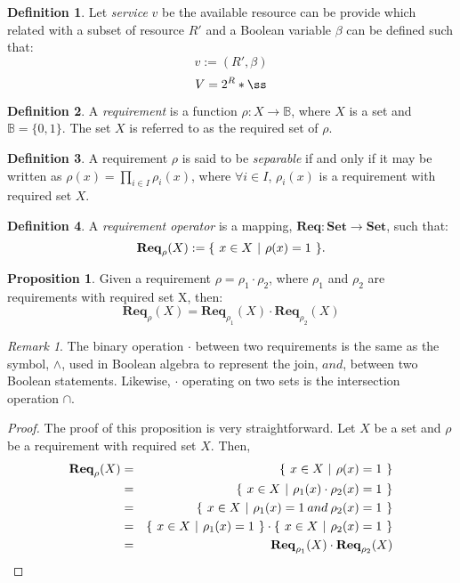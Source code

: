 \documentclass{article}
\theoremstyle{definition}
\newtheorem{definition}{Definition}[section]
\newtheorem{proposition}{Proposition}[section]
\theoremstyle{remark}
\newtheorem*{remark}{Remark}
\newcommand{\reqfunc}[2]{#1:#2\rightarrow\mathbb{B}}
\newcommand{\reqop}[2]{\mathbf{Req}_{#1}(#2)}
\newcommand{\setbuild}[3]
{
	\{\hspace{0.05in} 
	#1 \in #2 \hspace{0.05in} 
	| \hspace{0.05in}#3\hspace{0.05in}
	\}	
}
\begin{document}
		\begin{definition}
			Let \emph{service} $v$ be the available resource can be provide which related with a subset of resource $R'$ and a Boolean variable $\beta$ can be defined such that:
			\[
			v := (R', \beta)
			\]
			\[
			V = 2^{R}*{\ss}
			\]
		\end{definition}
	
	
		\begin{definition}
			A \emph{requirement} is a function $\reqfunc{\rho}{X}$, where $X$ is a set and $\mathbb{B} = \{0,1\}$. The set $X$ is referred to as the required set of $\rho$.
		\end{definition}
		
		\begin{definition}
			A requirement $\rho$ is said to be \emph{separable} if and only if it may be written as $\rho(x) = \prod_{i \in I}{\rho_{i}(x)}$, where $\forall i \in I$, $\rho_{i}(x)$ is a requirement with required set $X$.
		\end{definition}
		
		\begin{definition}
			A \emph{requirement operator} is a mapping, $\mathbf{Req}: \mathbf{Set} \rightarrow \mathbf{Set}$, such that: \[\reqop{\rho}{X} := \setbuild{x}	{X}{\rho(x) = 1}.\]
		\end{definition}
		
		\begin{proposition}
			Given a requirement $\rho = \rho_{1}\cdot\rho_{2}$, where $\rho_{1}$ and $\rho_{2}$ are requirements with required set X, then: 
			\[
			\reqop{\rho}{X}\stackrel{~}{=}\reqop{\rho_{1}}{X}\cdot\reqop{\rho_{2}}{X}
			\]
		\end{proposition}
		
		\begin{remark}
			The binary operation $\cdot$ between two requirements is the same as the symbol, $\wedge$, used in Boolean
 			algebra to represent the join, $and$, between two Boolean statements. Likewise, $\cdot$ operating on two sets
 			is the intersection operation $\cap$. 
		\end{remark}
		
		\begin{proof}
			The proof of this proposition is very straightforward. Let $X$ be a set and $\rho$ be a requirement with
 			required set $X$. Then,
			\begin{eqnarray}
			\reqop{\rho}{X} & = & \setbuild{x}{X}{\rho(x) = 1}\\ 
			& = & \setbuild{x}{X}{\rho_{1}(x)\cdot\rho_{2}(x) = 1}\\ 
			& = & \setbuild{x}{X}{\rho_{1}(x) = 1 \mathbin{and} \rho_{2}(x) = 1}\\ 
			& = & \setbuild{x}{X}{\rho_{1}(x) = 1}\cdot\setbuild{x}{X}{\rho_{2}(x) = 1}\\
			& = & \reqop{\rho_{1}}{X}\cdot\reqop{\rho_{2}}{X}
			\end{eqnarray}
		\end{proof}
	
\end{document}
